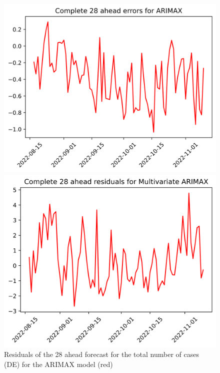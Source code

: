 \begin{figure}

\begin{minipage}{.32\textwidth}
  \centering
  \includegraphics[width=\linewidth]{pics/28_ah/DE_28_ahead_errors_ARIMAX.png}
  \caption{Residuals of the 28 ahead forecast for the total number of cases (DE) for the ARIMAX model (red)}
  \label{fig:tot_cases_error_28_ARIMAX_DE}
\end{minipage}
\begin{minipage}{.32\textwidth}
  \centering
  \includegraphics[width=\linewidth]{pics/28_ah/28_ahead_errors_Multivariate ARIMAX.png}

\end{minipage}
\end{figure}
